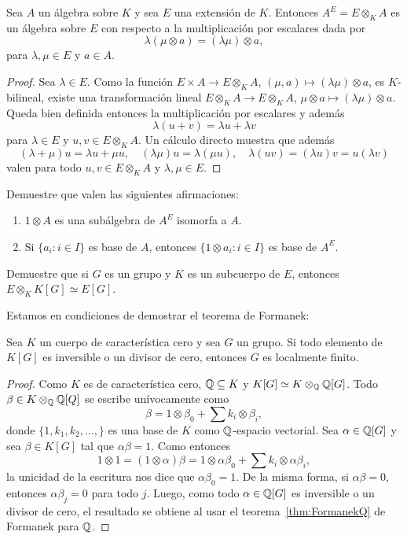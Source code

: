 \begin{theorem}
	Sea $A$ un álgebra sobre $K$ y sea $E$ una extensión de $K$. Entonces
	$A^E=E\otimes_KA$ es un álgebra sobre $E$ con respecto a la multiplicación
	por escalares dada por
	\[
		\lambda(\mu\otimes a)=(\lambda\mu)\otimes a,
	\]
	para $\lambda,\mu\in E$ y $a\in A$.
\end{theorem}

\begin{proof}
	Sea $\lambda\in E$. Como la función $E\times A\to E\otimes_KA$,
	$(\mu,a)\mapsto (\lambda\mu)\otimes a$, es $K$-bilineal, existe una
	transformación lineal $E\otimes_KA\to E\otimes_KA$, $\mu\otimes a\mapsto
	(\lambda\mu)\otimes a$. Queda bien definida entonces la multiplicación por
	escalares y además 
	\[
	\lambda(u+v)=\lambda u+\lambda v
	\]
	para $\lambda\in E$ y $u,v\in E\otimes_KA$. Un cálculo directo muestra que además 
	\[
	(\lambda+\mu)u=\lambda u+\mu u,
	\quad
	(\lambda\mu)u=\lambda(\mu u),
	\quad
	\lambda(uv)=(\lambda u)v=u(\lambda v)
	\]
	valen para todo $u,v\in E\otimes_KA$ y $\lambda,\mu\in E$.
\end{proof}

\begin{exercise}
	Demuestre que valen las siguientes afirmaciones:
	\begin{enumerate}
		\item $1\otimes A$ es una subálgebra de $A^E$ isomorfa a $A$.
		\item Si $\{a_i:i\in I\}$ es base de $A$, entonces $\{1\otimes a_i:i\in
			I\}$ es base de $A^E$.
	\end{enumerate}
\end{exercise}

\begin{exercise}
	Demuestre que si $G$ es un grupo y $K$ es un subcuerpo de $E$, entonces
	$E\otimes_K K[G]\simeq E[G]$.
\end{exercise}

Estamos en condiciones de demostrar el teorema de Formanek:

\begin{theorem}[Formanek]
	Sea $K$ un cuerpo de característica cero y sea $G$ un grupo. Si todo
	elemento de $K[G]$ es inversible o un divisor de cero, entonces $G$ es
	localmente finito.
\end{theorem}

\begin{proof}
	Como $K$ es de característica cero, $\mathbb{Q}\subseteq K$ y $K[G]\simeq
	K\otimes_{\mathbb{Q}}\mathbb{Q}[G]$. Todo $\beta\in K\otimes_{\mathbb{Q}}\mathbb{Q}[Q]$ se escribe
	unívocamente como 
	\[
		\beta=1\otimes\beta_0+\sum k_i\otimes\beta_i,
	\]
	donde $\{1,k_1,k_2,\dots,\}$ es una base de $K$ como $\mathbb{Q}$-espacio
	vectorial. Sea $\alpha\in\mathbb{Q}[G]$ y sea $\beta\in K[G]$ tal que $\alpha\beta=1$. Como entonces 
	\[
	1\otimes 1=(1\otimes\alpha)\beta=1\otimes \alpha\beta_0+\sum k_i\otimes \alpha\beta_i,
	\]
	la unicidad de la escritura nos dice que $\alpha\beta_0=1$. De la misma
	forma, si $\alpha\beta=0$, entonces $\alpha\beta_j=0$ para todo $j$. Luego,
	como todo $\alpha\in\mathbb{Q}[G]$ es inversible o un divisor de cero, el resultado
	se obtiene al usar el teorema~\ref{thm:FormanekQ} de Formanek para $\mathbb{Q}$.
\end{proof}

